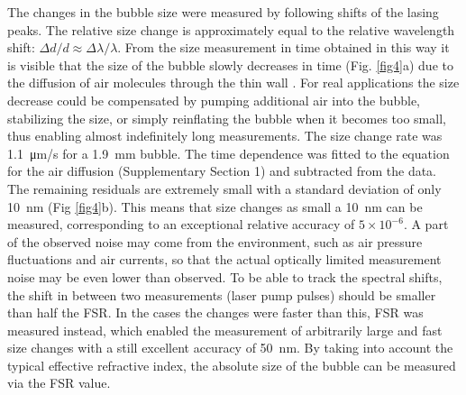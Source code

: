 \documentclass[a4paper,12pt]{article}
\begin{document}
	
	The changes in the bubble size were measured by following shifts of the lasing peaks. The relative size change is approximately equal to the relative wavelength shift: $\Delta d/d \approx \Delta \lambda/\lambda$. From the size measurement in time obtained in this way it is visible that the size of the bubble slowly decreases in time (Fig. \ref{fig4}a) due to the diffusion of air molecules through the thin wall \cite{ishii2009gas}. For real applications the size decrease could be compensated by pumping additional air into the bubble, stabilizing the size, or simply reinflating the bubble when it becomes too small, thus enabling almost indefinitely long measurements. The size change rate was \SI{1.1}{\micro m/s} for a \SI{1.9}{mm} bubble. The time dependence was fitted to the equation for the air diffusion (Supplementary Section 1) and subtracted from the data. The remaining residuals are extremely small with a standard deviation of only \SI{10}{nm} (Fig \ref{fig4}b). This means that size changes as small a \SI{10}{nm} can be measured, corresponding to an exceptional relative accuracy of $5 \times 10^{-6}$. A part of the observed noise may come from the environment, such as air pressure fluctuations and air currents, so that the actual optically limited measurement noise may be even lower than observed. To be able to track the spectral shifts, the shift in between two measurements (laser pump pulses) should be smaller than half the FSR. In the cases the changes were faster than this, FSR was measured instead, which enabled the measurement of arbitrarily large and fast size changes with a still excellent accuracy of \SI{50}{nm}. By taking into account the typical effective refractive index, the absolute size of the bubble can be measured via the FSR value. 
	
\end{document}
